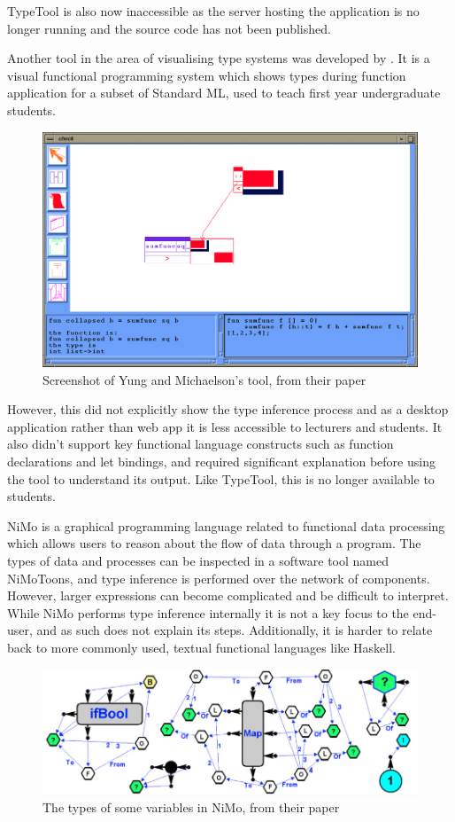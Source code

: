 \documentclass[a4paper,fleqn,oneside,12pt]{report}
\begin{document}
TypeTool is also now inaccessible as the server hosting the application is no longer running and the source code has not been published.

Another tool in the area of visualising type systems was developed by \cite{ref7}. It is a visual functional programming system which shows types during function application for a subset of Standard ML, used to teach first year undergraduate students.

{\centering \begin{figure}[h!]
  \centering
  \includegraphics[width=0.75\linewidth]{images/image6.png}
  \caption{Screenshot of Yung and Michaelson's tool, from their paper}
\end{figure} \par}

However, this did not explicitly show the type inference process and as a desktop application rather than web app it is less accessible to lecturers and students. It also didn't support key functional language constructs such as function declarations and let bindings, and required significant explanation before using the tool to understand its output. Like TypeTool, this is no longer available to students.

NiMo \citep{ref8} is a graphical programming language related to functional data processing which allows users to reason about the flow of data through a program. The types of data and processes can be inspected in a software tool named NiMoToons, and type inference is performed over the network of components. However, larger expressions can become complicated and be difficult to interpret. While NiMo performs type inference internally it is not a key focus to the end-user, and as such does not explain its steps. Additionally, it is harder to relate back to more commonly used, textual functional languages like Haskell.

{\centering \begin{figure}[h!]
  \centering
  \includegraphics[width=\linewidth]{images/image25.png}
  \caption{The types of some variables in NiMo, from their paper}
\end{figure} \par}
\end{document}
